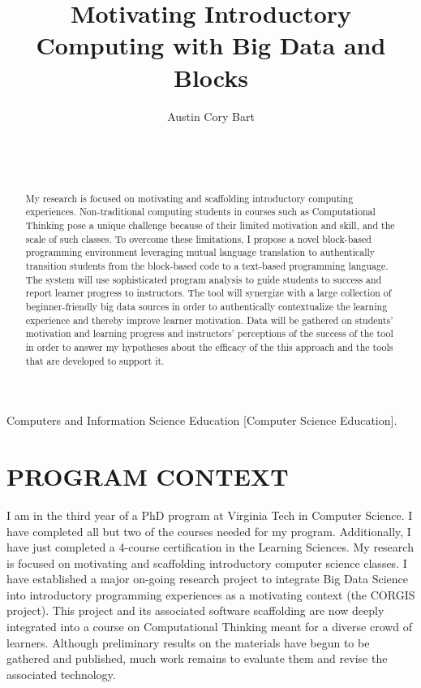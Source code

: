 \documentclass{sig-alternate}
\begin{document}
\pagestyle{empty}
\title{Motivating Introductory Computing with Big Data and Blocks}

\author{
 \alignauthor Austin Cory Bart\\
  \\
  \\
  \\
}

\maketitle

\begin{abstract}
My research is focused on motivating and scaffolding introductory computing experiences.
Non-traditional computing students in courses such as Computational Thinking pose a unique challenge because of their limited motivation and skill, and the scale of such classes.
To overcome these limitations, I propose a novel block-based programming environment leveraging mutual language translation to authentically transition students from the block-based code to a text-based programming language.
The system will use sophisticated program analysis to guide students to success and report learner progress to instructors.
The tool will synergize with a large collection of beginner-friendly big data sources in order to authentically contextualize the learning experience and thereby improve learner motivation.
Data will be gathered on students' motivation and learning progress and instructors' perceptions of the success of the tool in order to answer my hypotheses about the efficacy of the this approach and the tools that are developed to support it.
\end{abstract}

 {Computers and Information Science
  Education} [Computer Science Education].


\section{PROGRAM CONTEXT}
I am in the third year of a PhD program at Virginia Tech in Computer Science. I have completed all but two of the courses needed for my program.
Additionally, I have just completed a 4-course certification in the Learning Sciences.
My research is focused on motivating and scaffolding introductory computer science classes. I have established a major on-going research project to integrate Big Data Science into introductory programming experiences as a motivating context (the CORGIS project).
This project and its associated software scaffolding are now deeply integrated into a course on Computational Thinking meant for a diverse crowd of learners.
Although preliminary results on the materials have begun to be gathered and published, much work remains to evaluate them and revise the associated technology.
\end{document}
